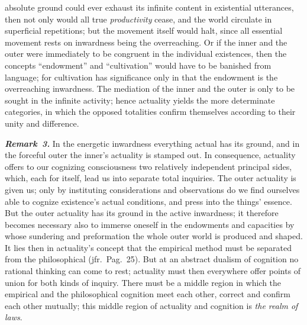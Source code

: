 \documentclass[12pt]{book}
\newcommand{\anm}[1]{\emph{\textbf{Remark~#1.}}}
\begin{document}
absolute ground could ever exhaust its infinite content in existential
utterances, then not only would all true \emph{productivity} cease, and the
world circulate in superficial repetitions; but the movement itself would
halt, since all essential movement rests on inwardness being the
overreaching. Or if the inner and the outer were immediately to be congruent
in the individual existences, then the concepts ``endowment'' and
``cultivation'' would have to be banished from language; for cultivation has
significance only in that the endowment is the overreaching inwardness. The
mediation of the inner and the outer is only to be sought in the infinite
activity; hence actuality yields the more determinate categories, in which
the opposed totalities confirm themselves according to their unity and
difference.

\anm{3} In the energetic inwardness everything actual has its ground, and in
the forceful outer the inner's actuality is stamped out. In consequence,
actuality offers to our cognizing consciousness two relatively independent
principal sides, which, each for itself, lead us into separate total
inquiries. The outer actuality is given us; only by instituting
considerations and observations do we find ourselves able to cognize
existence's actual conditions, and press into the things' essence. But the
outer actuality has its ground in the active inwardness; it therefore
becomes necessary also to immerse oneself in the endowments and capacities
by whose sundering and preformation the whole outer world is produced and
shaped. It lies then in actuality's concept that the empirical method must
be separated from the philosophical (jfr.\ Pag.\ 25). But at an abstract
dualism of cognition no rational thinking can come to rest; actuality must
then everywhere offer points of union for both kinds of inquiry. There must
be a middle region in which the empirical and the philosophical cognition
meet each other, correct and confirm each other mutually; this middle region
of actuality and cognition is \emph{the realm of laws}.
\end{document}
